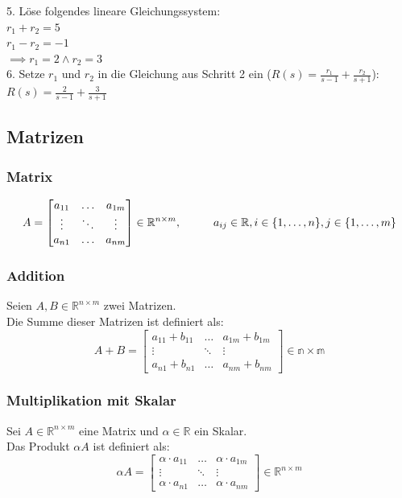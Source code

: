 \documentclass[10pt,a4paper]{article}
\newcommand{\tab}[1][1]{\hspace*{#1cm}}
\begin{document}
5. Löse folgendes lineare Gleichungssystem: \\
$r_1 + r_2 = 5$ \\
$r_1 - r_2 = -1$ \\
$\implies r_1 = 2 \land r_2 = 3$ \\

6. Setze $r_1$ und $r_2$ in die Gleichung aus Schritt 2 ein ($R(s) = \frac {r_1} {s - 1} + \frac {r_2} {s + 1}$): \\
$R(s) = \frac {2} {s - 1} + \frac {3} {s + 1}$

\subsection{Matrizen}
\subsubsection{Matrix}
$$
	A = \begin{bmatrix}
		a_{11} & \dots & a_{1m} \\
		\vdots & \ddots & \vdots \\
		a_{n1} & \dots & a_{nm}
	\end{bmatrix} \in \mathbb{R}^{n \times m}, \tab a_{ij} \in \mathbb{R}, i \in \{1, \dots, n\}, j \in \{1, \dots, m\}
$$

\subsubsection{Addition}
Seien $A, B \in \mathbb{R}^{n \times m}$ zwei Matrizen. \\
Die Summe dieser Matrizen ist definiert als:
$$
	A + B = \begin{bmatrix}
	a_{11} + b_{11} & \dots & a_{1m} + b_{1m}\\
	\vdots & \ddots & \vdots \\
	a_{n1} + b_{n1} & \dots & a_{nm} + b_{nm}
	\end{bmatrix} \in \mathbb{n \times m}
$$

\subsubsection{Multiplikation mit Skalar}
Sei $A \in \mathbb{R}^{n \times m}$ eine Matrix und $\alpha \in \mathbb{R}$ ein Skalar. \\
Das Produkt $\alpha A$ ist definiert als:
$$
\alpha A = \begin{bmatrix}
\alpha ⋅ a_{11} & \dots & \alpha ⋅ a_{1m} \\
\vdots & \ddots & \vdots \\
\alpha ⋅ a_{n1} & \dots & \alpha ⋅ a_{nm}
\end{bmatrix} \in \mathbb{R}^{n \times m}
$$
\end{document}
